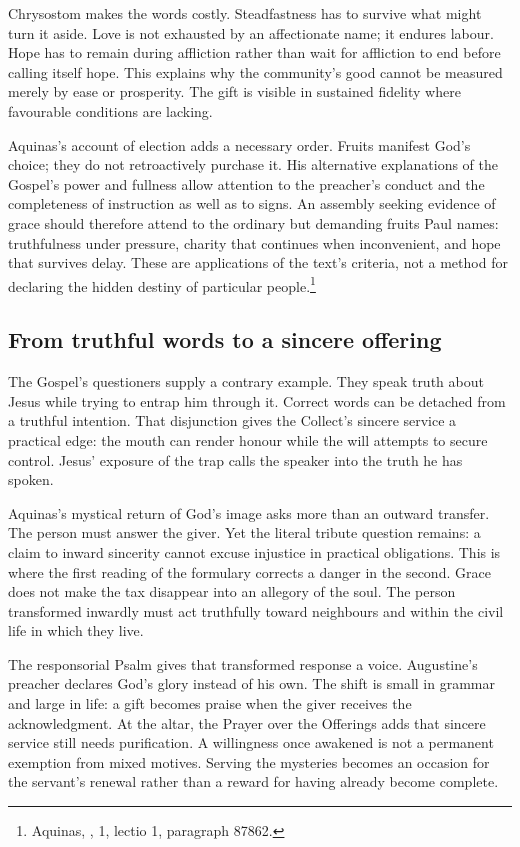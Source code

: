 Chrysostom makes the words costly. Steadfastness has to survive what might turn it aside. Love is not exhausted by an affectionate name; it endures labour. Hope has to remain during affliction rather than wait for affliction to end before calling itself hope. This explains why the community's good cannot be measured merely by ease or prosperity. The gift is visible in sustained fidelity where favourable conditions are lacking.

Aquinas's account of election adds a necessary order. Fruits manifest God's choice; they do not retroactively purchase it. His alternative explanations of the Gospel's power and fullness allow attention to the preacher's conduct and the completeness of instruction as well as to signs. An assembly seeking evidence of grace should therefore attend to the ordinary but demanding fruits Paul names: truthfulness under pressure, charity that continues when inconvenient, and hope that survives delay. These are applications of the text's criteria, not a method for declaring the hidden destiny of particular people.\footnote{Aquinas, , 1, lectio 1, paragraph 87862.}

\subsection{From truthful words to a sincere offering}
The Gospel's questioners supply a contrary example. They speak truth about Jesus while trying to entrap him through it. Correct words can be detached from a truthful intention. That disjunction gives the Collect's sincere service a practical edge: the mouth can render honour while the will attempts to secure control. Jesus' exposure of the trap calls the speaker into the truth he has spoken.

Aquinas's mystical return of God's image asks more than an outward transfer. The person must answer the giver. Yet the literal tribute question remains: a claim to inward sincerity cannot excuse injustice in practical obligations. This is where the first reading of the formulary corrects a danger in the second. Grace does not make the tax disappear into an allegory of the soul. The person transformed inwardly must act truthfully toward neighbours and within the civil life in which they live.

The responsorial Psalm gives that transformed response a voice. Augustine's preacher declares God's glory instead of his own. The shift is small in grammar and large in life: a gift becomes praise when the giver receives the acknowledgment. At the altar, the Prayer over the Offerings adds that sincere service still needs purification. A willingness once awakened is not a permanent exemption from mixed motives. Serving the mysteries becomes an occasion for the servant's renewal rather than a reward for having already become complete.

